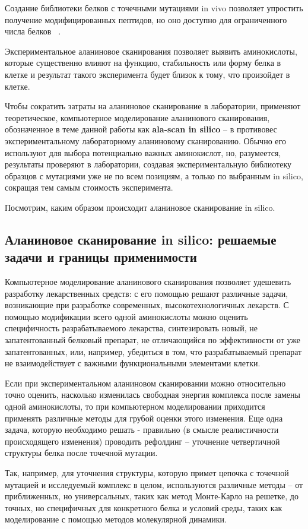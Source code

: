 Создание библиотеки белков с точечными мутациями in vivo позволяет упростить получение модифицированных пептидов, но оно доступно для ограниченного числа белков ~\cite{alascan2001}.

Экспериментальное аланиновое  сканирования позволяет выявить  аминокислоты, которые существенно влияют на функцию, стабильность или форму белка в клетке и результат такого эксперимента будет близок к тому, что произойдет в клетке. 

Чтобы сократить затраты на аланиновое сканирование в лаборатории, применяют теоретическое, компьютерное моделирование аланинового сканирования, обозначенное в теме данной работы как \textbf{ala-scan in silico} -- в противовес экспериментальному лабораторному аланиновому сканированию. Обычно его используют для выбора потенциально важных аминокислот, но, разумеется, результаты проверяют в лаборатории, создавая экспериментальную библиотеку образцов с мутациями уже не по всем позициям, а только по выбранным in silico, сокращая тем самым стоимость эксперимента.

Посмотрим, каким образом происходит аланиновое сканирование in silico.
\subsection{Аланиновое сканирование in silico: решаемые задачи и границы применимости}

Компьютерное моделирование аланинового сканирования позволяет удешевить разработку лекарственных средств: с его помощью решают различные задачи, возникающие при разработке современных, высокотехнологичных лекарств. С помощью модификации всего одной аминокислоты можно оценить специфичность разрабатываемого лекарства, синтезировать новый, не запатентованный белковый препарат, не отличающийся по эффективности от уже запатентованных, или, например, убедиться в том, что разрабатываемый препарат не взаимодействует с важными функциональными элементами клетки. 


Если при экспериментальном аланиновом сканировании можно относительно точно оценить, насколько изменилась свободная энергия комплекса после замены одной аминокислоты, то при компьютерном моделировании приходится применять различные методы для грубой оценки этого изменения. Еще одна задача, которую необходимо решать - правильно (в смысле реалистичности происходящего изменения) проводить рефолдинг -- уточнение четвертичной структуры белка после точечной мутации.

Так, например, для уточнения структуры, которую примет цепочка с точечной мутацией и исследуемый комплекс в целом, используются различные методы -- от приближенных, но универсальных, таких как метод Монте-Карло на решетке, до точных, но специфичных для конкретного белка и условий среды, таких как моделирование с помощью методов молекулярной динамики.

